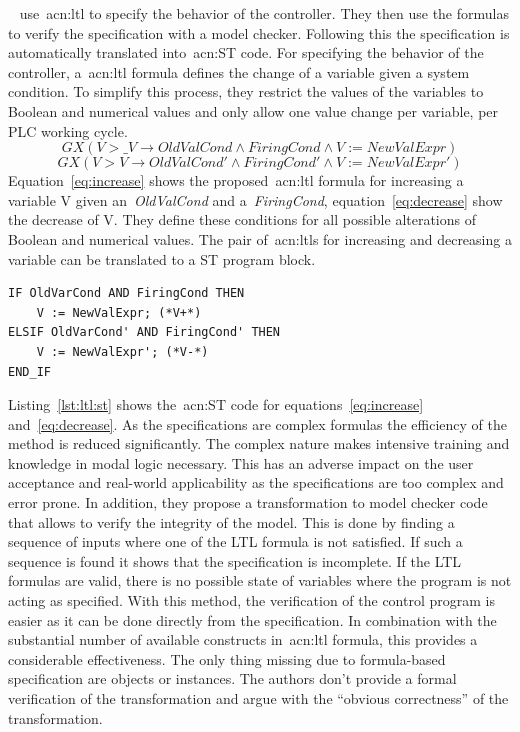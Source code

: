 \citeauthor{Kuzmin:2013}~\cite{Kuzmin:2013} use~\acrshort{acn:ltl} to specify the behavior of the controller.
They then use the formulas to verify the specification with a model checker.
Following this the specification is  automatically translated into~\acrshort{acn:ST} code.
For specifying the behavior of the controller, a~\acrfull{acn:ltl} formula defines the change of a variable given a system condition.
To simplify this process, they restrict the values of the variables to Boolean and numerical values and only allow one value change per variable, per PLC working cycle.
\begin{equation}
GX\left(V > \_V \rightarrow OldValCond \land FiringCond \land V := NewValExpr \right)
\label{eq:increase}
\end{equation}
\begin{equation}
GX\left(V > V \rightarrow OldValCond' \land FiringCond' \land V := NewValExpr' \right)
\label{eq:decrease}
\end{equation}
Equation~\ref{eq:increase} shows the proposed~\acrshort{acn:ltl} formula for increasing a variable V given an~\textit{OldValCond} and a~\textit{FiringCond}, equation~\ref{eq:decrease} show the decrease of V.
They define these conditions for all possible alterations of Boolean and numerical values.
The pair of~\acrshort{acn:ltl}s for increasing and decreasing a variable can be translated to a ST program block.
\lstset{language=Pascal}
\begin{lstlisting}[caption={
Auto-generated~\gls{acn:ST} code realizing the~\acrshort{acn:ltl} formulas~\ref{eq:decrease} and~\ref{eq:increase}.~\cite{Kuzmin:2013}},label=lst:ltl:st]
IF OldVarCond AND FiringCond THEN
    V := NewValExpr; (*V+*)
ELSIF OldVarCond' AND FiringCond' THEN
    V := NewValExpr'; (*V-*)
END_IF
\end{lstlisting}
Listing~\ref{lst:ltl:st} shows the~\acrshort{acn:ST} code for equations~\ref{eq:increase} and~\ref{eq:decrease}.
As the specifications are complex formulas the efficiency of the method is reduced significantly.
The complex nature makes intensive training and knowledge in modal logic necessary.
This has an adverse impact on the user acceptance and real-world applicability as the specifications are too complex and error prone.
In addition, they propose a transformation to model checker code that allows to verify the integrity of the model.
This is done by finding a sequence of inputs where one of the LTL formula is not satisfied.
If such a sequence is found it shows that the specification is incomplete.
If the LTL formulas are valid, there is no possible state of variables where the program is not acting as specified.
With this method, the verification of the control program is easier as it can be done directly from the specification.
In combination with the substantial number of available constructs in~\acrshort{acn:ltl} formula, this provides a considerable effectiveness.
The only thing missing due to formula-based specification are objects or instances.
The authors don't provide a formal verification of the transformation and argue with the \enquote{obvious correctness} of the transformation.

